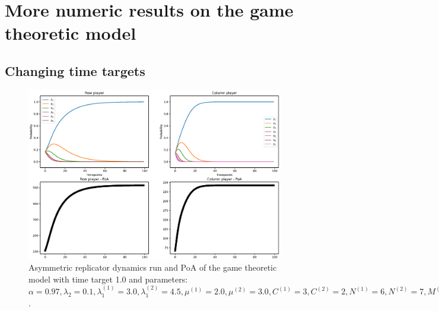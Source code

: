 \chapter{More numeric results on the game theoretic model}
\label{appendix:game_theoretic_model}

\section{Changing time targets}

\begin{figure}[H]
    \includegraphics[width=\textwidth, trim = 0 60 0 60, clip]{chapters/00_appendix/02_more_game_results/Bin/poa_ard_target_1.eps}
    \caption{Asymmetric replicator dynamics run and PoA of the game theoretic
    model with time target 1.0 and parameters: \(\alpha = 0.97,
    \lambda_2 = 0.1, \lambda_1^{(1)} = 3.0, \lambda_1^{(2)} = 4.5,
    \mu^{(1)} = 2.0, \mu^{(2)} = 3.0, C^{(1)} = 3, C^{(2)} = 2,
    N^{(1)} = 6, N^{(2)} = 7, M^{(1)} = 5, M^{(2)} = 4\).}
    \label{fig:poa_ard_target_1}
\end{figure}


